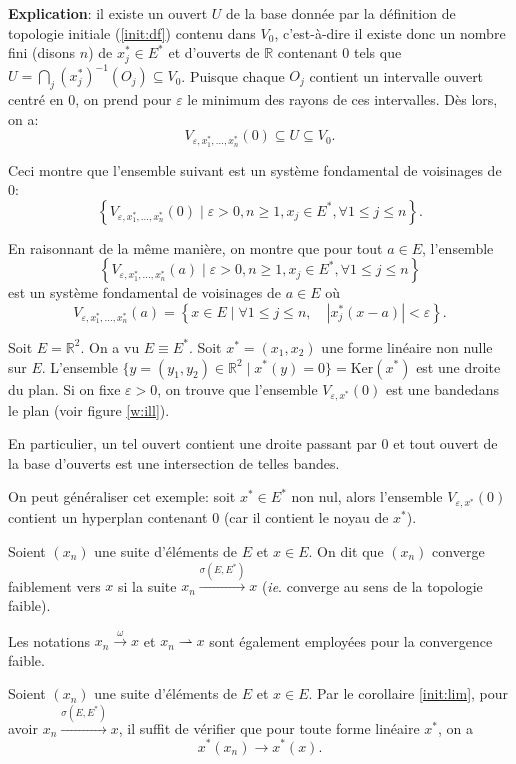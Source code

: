 \textbf{Explication}: il existe un ouvert $U$ de la base
donnée par la définition de topologie initiale (\ref{init:df})
contenu dans $V_0$, c'est-à-dire
il existe donc un nombre fini (disons $n$) de $x_j^*\in E^*$ et d'ouverts de
$\mathbb R$ contenant $0$ tels que
$U=\bigcap_{j}(x_j^*)^{-1}(O_j)\subseteq V_0$.
Puisque chaque $O_j$ contient un intervalle ouvert centré
en $0$,
on prend pour $\varepsilon$ le minimum des rayons de ces intervalles.
Dès lors, on a:
$$V_{\varepsilon, x_1^*, \ldots, x_n^*}(0)\subseteq U \subseteq V_0.$$

Ceci montre que l'ensemble suivant est un système fondamental
de voisinages de $0$:
$$\left\{V_{\varepsilon, x_1^*, \ldots, x_n^*}(0)\mid \varepsilon > 0,
  n\geq 1, x_j\in E^*, \forall 1\leq j\leq n\right\}. $$

En raisonnant de la même manière, on montre que pour tout $a\in E$,
l'ensemble
$$\left\{V_{\varepsilon, x_1^*, \ldots, x_n^*}(a)\mid \varepsilon > 0,
  n\geq 1, x_j\in E^*, \forall 1\leq j\leq n\right\}$$
est un système fondamental de voisinages de $a\in E$
où $$V_{\varepsilon, x_1^*, \ldots, x_n^*}(a) =
   \left\{ x\in E\mid \forall 1\leq j\leq n,\quad
    |x_j^*(x-a)| < \varepsilon\right\}.$$


\begin{ex}
  Soit $E = \mathbb R^2$. On a vu $E \equiv E^*$.
  Soit $x^*=(x_1, x_2)$ une forme linéaire non nulle sur $E$. L'ensemble
  $\{y = (y_1, y_2)\in \mathbb R^2\mid x^*(y)=0\} = \mathrm{Ker}(x^*)$
  est une droite du plan. Si on fixe $\varepsilon > 0$, on trouve
  que l'ensemble $V_{\varepsilon, x^*}(0)$ est une \og bande\fg dans le plan
  (voir figure \ref{w:ill}).

  En particulier, un tel ouvert contient une droite passant par $0$ et
  tout ouvert de la base d'ouverts est une intersection de telles bandes.
\end{ex}

On peut généraliser cet exemple: soit $x^*\in E^*$
non nul, alors l'ensemble $V_{\varepsilon, x^*}(0)$ contient un hyperplan
contenant $0$ (car il contient le noyau de $x^*$).

\begin{df}
  Soient $(x_n)$ une suite d'éléments de $E$ et $x\in E$.
  On dit que $(x_n)$ converge faiblement vers $x$ si la suite
  $x_n\xrightarrow{\sigma(E, E^*)}x$ (\emph{ie}. converge au sens de la topologie
  faible).

  Les notations $x_n\xrightarrow{\omega}x$ et $x_n\rightharpoonup x$ sont
  également employées pour la convergence faible.
\end{df}
\begin{lem}
  Soient $(x_n)$ une suite d'éléments de $E$ et $x\in E$.
  Par le corollaire \ref{init:lim}, pour avoir
  $x_n\xrightarrow{\sigma(E, E^*)}x$,  il suffit de vérifier que pour
  toute forme linéaire $x^*$, on a $$x^*(x_n)\to x^*(x).$$
\end{lem}

